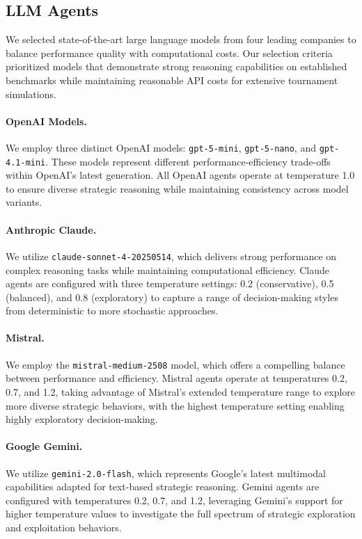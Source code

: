 
\subsection{LLM Agents}
We selected state-of-the-art large language models from four leading companies to balance performance quality with computational costs. Our selection criteria prioritized models that demonstrate strong reasoning capabilities on established benchmarks while maintaining reasonable API costs for extensive tournament simulations.

\paragraph{OpenAI Models.}
We employ three distinct OpenAI models: \texttt{gpt-5-mini}, \texttt{gpt-5-nano}, and \texttt{gpt-4.1-mini}. These models represent different performance-efficiency trade-offs within OpenAI's latest generation. All OpenAI agents operate at temperature 1.0 to ensure diverse strategic reasoning while maintaining consistency across model variants.

\paragraph{Anthropic Claude.}
We utilize \texttt{claude-sonnet-4-20250514}, which delivers strong performance on complex reasoning tasks while maintaining computational efficiency. Claude agents are configured with three temperature settings: 0.2 (conservative), 0.5 (balanced), and 0.8 (exploratory) to capture a range of decision-making styles from deterministic to more stochastic approaches.

\paragraph{Mistral.}
We employ the \texttt{mistral-medium-2508} model, which offers a compelling balance between performance and efficiency. Mistral agents operate at temperatures 0.2, 0.7, and 1.2, taking advantage of Mistral's extended temperature range to explore more diverse strategic behaviors, with the highest temperature setting enabling highly exploratory decision-making.

\paragraph{Google Gemini.}
We utilize \texttt{gemini-2.0-flash}, which represents Google's latest multimodal capabilities adapted for text-based strategic reasoning. Gemini agents are configured with temperatures 0.2, 0.7, and 1.2, leveraging Gemini's support for higher temperature values to investigate the full spectrum of strategic exploration and exploitation behaviors.

